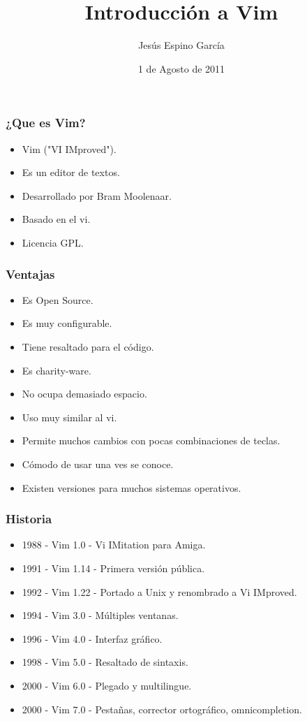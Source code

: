 \documentclass[10pt]{beamer}
\title{Introducción a Vim}
\author{Jesús Espino García}
\date{1 de Agosto de 2011}
\institute[Kaleidos]{Kaleidos}
\begin{document}
  \frame{\maketitle}


  \begin{frame}
    \frametitle{¿Que es Vim?}
    \begin{itemize}
      \item Vim ("VI IMproved").
      \item Es un editor de textos.
      \item Desarrollado por Bram Moolenaar.
      \item Basado en el vi.
      \item Licencia GPL.
    \end{itemize}
  \end{frame}

  \begin{frame}
    \frametitle{Ventajas}
  
    \begin{itemize}
      \item Es Open Source.
      \item Es muy configurable.
      \item Tiene resaltado para el código.
      \item Es charity-ware.
      \item No ocupa demasiado espacio.
      \item Uso muy similar al vi.
      \item Permite muchos cambios con pocas combinaciones de teclas.
      \item Cómodo de usar una ves se conoce.
      \item Existen versiones para muchos sistemas operativos.
    \end{itemize}
  \end{frame}

  \begin{frame}
    \frametitle{Historia}
    \begin{itemize}
      \item 1988 - Vim 1.0 - Vi IMitation para Amiga.
      \item 1991 - Vim 1.14 - Primera versión pública.
      \item 1992 - Vim 1.22 - Portado a Unix y renombrado a Vi IMproved.
      \item 1994 - Vim 3.0 - Múltiples ventanas.
      \item 1996 - Vim 4.0 - Interfaz gráfico.
      \item 1998 - Vim 5.0 - Resaltado de sintaxis.
      \item 2000 - Vim 6.0 - Plegado y multilingue.
      \item 2000 - Vim 7.0 - Pestañas, corrector ortográfico, omnicompletion.
    \end{itemize}
  \end{frame}
\end{document}
